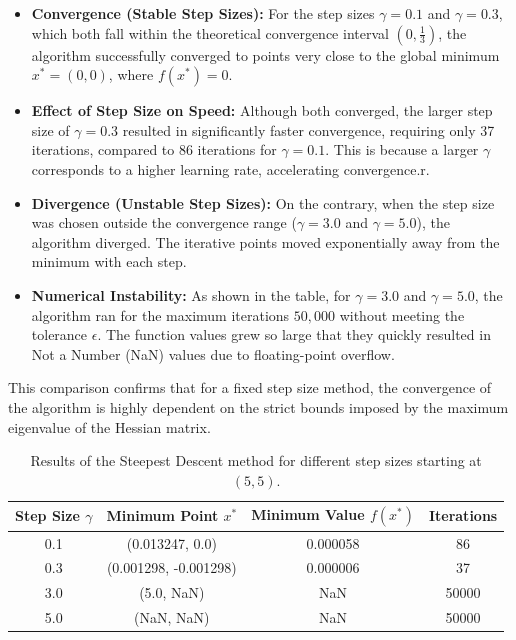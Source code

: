 \documentclass[11pt]{article}
\begin{document}
\begin{itemize}
    \item \textbf{Convergence (Stable Step Sizes):} For the step sizes $\gamma=0.1$ and $\gamma=0.3$, which both fall within the theoretical convergence interval $\left(0, \frac{1}{3}\right)$, the algorithm successfully converged to points very close to the global minimum $x^* = (0, 0)$, where $f(x^*)=0$.
    \item \textbf{Effect of Step Size on Speed:} Although both converged, the larger step size of $\gamma=0.3$ resulted in significantly faster convergence, requiring only 37 iterations, compared to 86 iterations for $\gamma=0.1$. This is because a larger $\gamma$ corresponds to a higher learning rate, accelerating convergence.r. 
    \item \textbf{Divergence (Unstable Step Sizes):} On the contrary, when the step size was chosen outside the convergence range ($\gamma=3.0$ and $\gamma=5.0$), the algorithm diverged. The iterative points moved exponentially away from the minimum with each step.
    \item \textbf{Numerical Instability:} As shown in the table, for $\gamma=3.0$ and $\gamma=5.0$, the algorithm ran for the maximum iterations $50,000$ without meeting the tolerance $\epsilon$. The function values grew so large that they quickly resulted in Not a Number (NaN) values due to floating-point overflow.
\end{itemize}

This comparison confirms that for a fixed step size method, the convergence of the algorithm is highly dependent on the strict bounds imposed by the maximum eigenvalue of the Hessian matrix.

\begin{table}[h!]
\centering
\begin{tabular}{|c|c|c|c|}
\hline
\textbf{Step Size $\gamma$} & \textbf{Minimum Point $x^*$} & \textbf{Minimum Value $f(x^*)$} & \textbf{Iterations} \\
\hline
0.1 & (0.013247, 0.0) & 0.000058 & 86 \\
0.3 & (0.001298, -0.001298) & 0.000006 & 37 \\
3.0 & (5.0, NaN) & NaN & 50000 \\
5.0 & (NaN, NaN) & NaN & 50000 \\
\hline
\end{tabular}
\caption{Results of the Steepest Descent method for different step sizes starting at $(5,5)$.}
\label{tab:steepest_descent}
\end{table}
\end{document}

